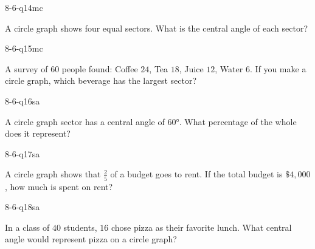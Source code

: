 \begin{practiceQuestion}{8-6-q14}{mc}
\begin{questionText}
A circle graph shows four equal sectors. What is the central angle of each sector?
\end{questionText}
\end{practiceQuestion}

\begin{practiceQuestion}{8-6-q15}{mc}
\begin{questionText}
A survey of $60$ people found: Coffee $24$, Tea $18$, Juice $12$, Water $6$. If you make a circle graph, which beverage has the largest sector?
\end{questionText}
\end{practiceQuestion}


\begin{practiceQuestion}{8-6-q16}{sa}
\begin{questionText}
A circle graph sector has a central angle of $60°$. What percentage of the whole does it represent?
\end{questionText}
\end{practiceQuestion}

\begin{practiceQuestion}{8-6-q17}{sa}
\begin{questionText}
A circle graph shows that $\frac{2}{5}$ of a budget goes to rent. If the total budget is $\$4{,}000$, how much is spent on rent?
\end{questionText}
\end{practiceQuestion}

\begin{practiceQuestion}{8-6-q18}{sa}
\begin{questionText}
In a class of $40$ students, $16$ chose pizza as their favorite lunch. What central angle would represent pizza on a circle graph?
\end{questionText}
\end{practiceQuestion}

